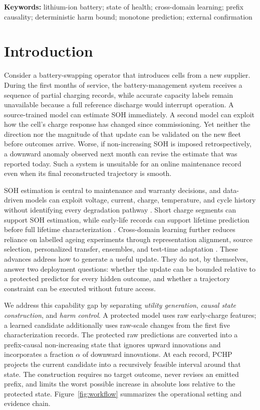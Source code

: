 \documentclass[11pt]{article}
\begin{document}
\noindent\textbf{Keywords:} lithium-ion battery; state of health; cross-domain learning; prefix causality; deterministic harm bound; monotone prediction; external confirmation

\section{Introduction}

Consider a battery-swapping operator that introduces cells from a new supplier. During the first months of service, the battery-management system receives a sequence of partial charging records, while accurate capacity labels remain unavailable because a full reference discharge would interrupt operation. A source-trained model can estimate SOH immediately. A second model can exploit how the cell's charge response has changed since commissioning. Yet neither the direction nor the magnitude of that update can be validated on the new fleet before outcomes arrive. Worse, if non-increasing SOH is imposed retrospectively, a downward anomaly observed next month can revise the estimate that was reported today. Such a system is unsuitable for an online maintenance record even when its final reconstructed trajectory is smooth.

SOH estimation is central to maintenance and warranty decisions, and data-driven models can exploit voltage, current, charge, temperature, and cycle history without identifying every degradation pathway \citep{ng2020mlbattery,roman2021pipeline}. Short charge segments can support SOH estimation, while early-life records can support lifetime prediction before full lifetime characterization \citep{roman2021pipeline,severson2019cyclelife}. Cross-domain learning further reduces reliance on labelled ageing experiments through representation alignment, source selection, personalized transfer, ensembles, and test-time adaptation \citep{li2020sstca,ma2022personalized,lu2023without,duan2025wasserstein,feng2024batteryttt}. These advances address how to generate a useful update. They do not, by themselves, answer two deployment questions: whether the update can be bounded relative to a protected predictor for every hidden outcome, and whether a trajectory constraint can be executed without future access.

We address this capability gap by separating \emph{utility generation}, \emph{causal state construction}, and \emph{harm control}. A protected model uses raw early-charge features; a learned candidate additionally uses raw-scale changes from the first five characterization records. The protected raw predictions are converted into a prefix-causal non-increasing state that ignores upward innovations and incorporates a fraction $\alpha$ of downward innovations. At each record, PCHP projects the current candidate into a recursively feasible interval around that state. The construction requires no target outcome, never revises an emitted prefix, and limits the worst possible increase in absolute loss relative to the protected state. Figure~\ref{fig:workflow} summarizes the operational setting and evidence chain.
\end{document}
